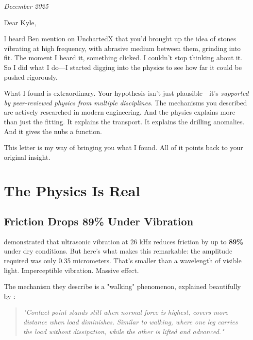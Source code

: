 \documentclass[11pt]{article}
\begin{document}
\begin{flushright}
\textit{December 2025}
\end{flushright}

\vspace{0.5cm}

\noindent Dear Kyle,

\vspace{0.3cm}

I heard Ben mention on UnchartedX that you'd brought up the idea of stones vibrating at high frequency, with abrasive medium between them, grinding into fit. The moment I heard it, something clicked. I couldn't stop thinking about it. So I did what I do—I started digging into the physics to see how far it could be pushed rigorously.

What I found is extraordinary. Your hypothesis isn't just plausible—it's \textit{supported by peer-reviewed physics from multiple disciplines}. The mechanisms you described are actively researched in modern engineering. And the physics explains more than just the fitting. It explains the transport. It explains the drilling anomalies. And it gives the nubs a function.

This letter is my way of bringing you what I found. All of it points back to your original insight.

\section*{The Physics Is Real}

\subsection*{Friction Drops 89\% Under Vibration}

\citet{Luo2024} demonstrated that ultrasonic vibration at 26 kHz reduces friction by up to \textbf{89\%} under dry conditions. But here's what makes this remarkable: the amplitude required was only 0.35 micrometers. That's smaller than a wavelength of visible light. Imperceptible vibration. Massive effect.

The mechanism they describe is a "walking" phenomenon, explained beautifully by \citet{Popov2020}:

\begin{quote}
\textit{"Contact point stands still when normal force is highest, covers more distance when load diminishes. Similar to walking, where one leg carries the load without dissipation, while the other is lifted and advanced."}
\end{quote}
\end{document}
